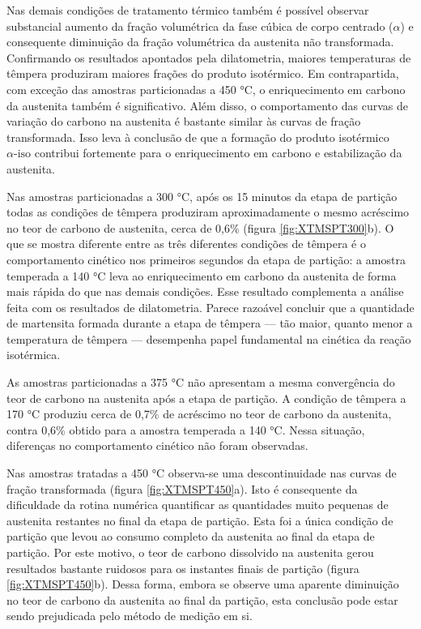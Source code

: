 Nas demais condições de tratamento térmico também é possível observar substancial aumento da fração volumétrica da fase cúbica de corpo centrado ($\alpha$) e consequente diminuição da fração volumétrica da austenita não transformada. Confirmando os resultados apontados pela dilatometria, maiores temperaturas de têmpera produziram maiores frações do produto isotérmico. Em contrapartida, com exceção das amostras particionadas a 450 °C, o enriquecimento em carbono da austenita também é significativo. Além disso, o comportamento das curvas de variação do carbono na austenita é bastante similar às curvas de fração transformada. Isso leva à conclusão de que a formação do produto isotérmico $\alpha\text{-iso}$ contribui fortemente para o enriquecimento em carbono e estabilização da austenita.

Nas amostras particionadas a 300 °C, após os 15 minutos da etapa de partição todas as condições de têmpera produziram aproximadamente o mesmo acréscimo no teor de carbono de austenita, cerca de 0,6\% (figura \ref{fig:XTMSPT300}b). O que se mostra diferente entre as três diferentes condições de têmpera é o comportamento cinético nos primeiros segundos da etapa de partição: a amostra temperada a 140 °C leva ao enriquecimento em carbono da austenita de forma mais rápida do que nas demais condições. Esse resultado complementa a análise feita com os resultados de dilatometria. Parece razoável concluir que a quantidade de martensita formada durante a etapa de têmpera --- tão maior, quanto menor a temperatura de têmpera --- desempenha papel fundamental na cinética da reação isotérmica.

As amostras particionadas a 375 °C não apresentam a mesma convergência do teor de carbono na austenita após a etapa de partição. A condição de têmpera a 170 °C produziu cerca de 0,7\% de acréscimo no teor de carbono da austenita, contra 0,6\% obtido para a amostra temperada a 140 °C. Nessa situação, diferenças no comportamento cinético não foram observadas.

Nas amostras tratadas a 450 °C observa-se uma descontinuidade nas curvas de fração transformada (figura \ref{fig:XTMSPT450}a). Isto é consequente da dificuldade da rotina numérica quantificar as quantidades muito pequenas de austenita restantes no final da etapa de partição. Esta foi a única condição de partição que levou ao consumo completo da austenita ao final da etapa de partição. Por este motivo, o teor de carbono dissolvido na austenita gerou resultados bastante ruidosos para os instantes finais de partição (figura \ref{fig:XTMSPT450}b). Dessa forma, embora se observe uma aparente diminuição no teor de carbono da austenita ao final da partição, esta conclusão pode estar sendo prejudicada pelo método de medição em si.

